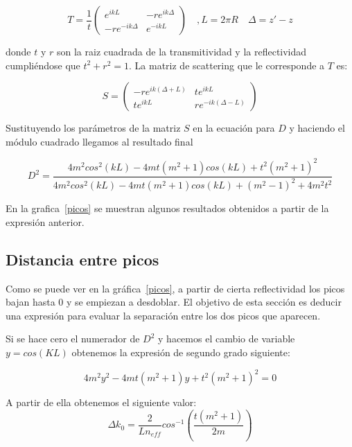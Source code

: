 \documentclass[oneside]{article}
\begin{document}
\begin{equation*}
   T = \frac{1}{t}
   \begin{pmatrix}
      e^{ikL} & -re^{ik\Delta}  \\
      -re^{-ik\Delta} & e^{-ikL}
   \end{pmatrix}
   \quad ,
   L = 2\pi R \quad
   \Delta = z' - z
\end{equation*}

donde $t$ y $r$ son la raiz cuadrada de la transmitividad y la reflectividad
cumpliéndose que $t^2 + r^2 = 1$.
La matriz de scattering que le corresponde a $T$ es:

\begin{equation*}
   S =
   \begin{pmatrix}
      -re^{ik(\Delta + L)} & te^{ikL} \\
      te^{ikL} & re^{-ik(\Delta - L)}
   \end{pmatrix}
\end{equation*}

Sustituyendo los parámetros de la matriz $S$ en la ecuación para $D$ y haciendo
el módulo cuadrado llegamos al resultado final

\begin{equation*}
   D^2=\frac{4m^2cos^2(kL)-4mt(m^2+1)cos(kL)+t^2(m^2+1)^2}{4m^2cos^2(kL)-4mt(m^2+1)cos(kL) + (m^2-1)^2 + 4m^2t^2}
\end{equation*}

En la grafica~\ref{picos} se muestran algunos resultados obtenidos a partir de
la expresión anterior.

\subsection{Distancia entre picos}
Como se puede ver en la gráfica~\ref{picos}, a partir de cierta reflectividad 
los picos bajan hasta $0$ y se empiezan a desdoblar. El objetivo de esta sección
es deducir una expresión para evaluar la separación entre los dos picos que
aparecen.

Si se hace cero el numerador de $D^2$ y hacemos el cambio de variable
$y=cos(KL)$ obtenemos la expresión de segundo grado siguiente:

\begin{equation*}
   4m^2y^2 - 4mt(m^2+1)y + t^2(m^2+1)^2 = 0
\end{equation*}

A partir de ella obtenemos el siguiente valor:
\begin{equation*}
   \Delta k_0 = \frac{2}{Ln_{eff}} cos^{-1}\left(\frac{t(m^2+1)}{2m}\right)
\end{equation*}
\end{document}
